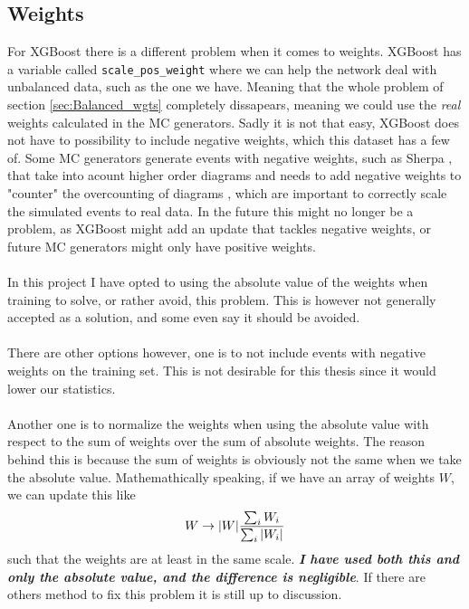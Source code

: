 \documentclass[14pt, a4paper]{book}
\begin{document}
\subsection{Weights}
For XGBoost there is a different problem when it comes to weights. XGBoost has a variable called \verb|scale_pos_weight| where we can help the network deal with unbalanced data, such as the one we have. 
Meaning that the whole problem of section \ref{sec:Balanced_wgts} completely dissapears, meaning we could use the \textit{real} weights calculated in the MC generators.
Sadly it is not that easy, XGBoost does not have to possibility to include negative weights, which this dataset has a few of. Some MC generators generate events with negative weights, such as Sherpa , that take into acount higher order diagrams and needs to add 
negative weights to "counter" the overcounting of diagrams \cite{Negative_Weights_article}, which are important to correctly scale the simulated events to real data.
In the future this might no longer be a problem, as XGBoost might add an update that tackles negative weights, or  future MC generators might only have positive weights.\\
\\In this project I have opted to using the absolute value of the weights when training to solve, or rather avoid, this problem. 
This is however not generally accepted as a solution, and some even say it should be avoided. \\
\\There are other options however, one is to not include events with negative weights on the training set. This is not desirable for this thesis since it would lower our statistics.\\
\\Another one  is to normalize the weights when using the absolute value with respect to the sum of weights over the sum of absolute weights. The reason behind this is because the sum of weights is obviously not the same when we take the absolute value. 
Mathemathically speaking, if we have an array of weights $W$, we can update this like
$$
W \rightarrow \abs{W}\frac{\sum_i W_i}{\sum_i\abs{W_i}}
$$
such that the weights are at least in the same scale. \textit{\textbf{I have used both this and only the absolute value, and the difference is negligible}}. 
If there are others method to fix this problem it is still up to discussion.
\end{document}
